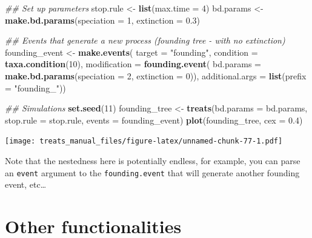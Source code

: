 \documentclass[
]{book}
\newenvironment{Shaded}{\begin{snugshade}}{\end{snugshade}}
\newcommand{\CommentTok}[1]{\textcolor[rgb]{0.56,0.35,0.01}{\textit{#1}}}
\newcommand{\DataTypeTok}[1]{\textcolor[rgb]{0.13,0.29,0.53}{#1}}
\newcommand{\DecValTok}[1]{\textcolor[rgb]{0.00,0.00,0.81}{#1}}
\newcommand{\FloatTok}[1]{\textcolor[rgb]{0.00,0.00,0.81}{#1}}
\newcommand{\KeywordTok}[1]{\textcolor[rgb]{0.13,0.29,0.53}{\textbf{#1}}}
\newcommand{\NormalTok}[1]{#1}
\newcommand{\StringTok}[1]{\textcolor[rgb]{0.31,0.60,0.02}{#1}}
\begin{document}
\begin{Shaded}
\begin{Highlighting}[]
\CommentTok{\#\# Set up parameters}
\NormalTok{stop.rule \textless{}{-}}\StringTok{ }\KeywordTok{list}\NormalTok{(}\DataTypeTok{max.time =} \DecValTok{4}\NormalTok{)}
\NormalTok{bd.params \textless{}{-}}\StringTok{ }\KeywordTok{make.bd.params}\NormalTok{(}\DataTypeTok{speciation =} \DecValTok{1}\NormalTok{, }\DataTypeTok{extinction =} \FloatTok{0.3}\NormalTok{)}

\CommentTok{\#\# Events that generate a new process (founding tree {-} with no extinction)}
\NormalTok{founding\_event \textless{}{-}}\StringTok{ }\KeywordTok{make.events}\NormalTok{(}
                  \DataTypeTok{target       =} \StringTok{"founding"}\NormalTok{,}
                  \DataTypeTok{condition    =} \KeywordTok{taxa.condition}\NormalTok{(}\DecValTok{10}\NormalTok{),}
                  \DataTypeTok{modification =} \KeywordTok{founding.event}\NormalTok{(}
                                    \DataTypeTok{bd.params =} \KeywordTok{make.bd.params}\NormalTok{(}\DataTypeTok{speciation =} \DecValTok{2}\NormalTok{,}
                                                               \DataTypeTok{extinction =} \DecValTok{0}\NormalTok{)),}
                  \DataTypeTok{additional.args =} \KeywordTok{list}\NormalTok{(}\DataTypeTok{prefix =} \StringTok{"founding\_"}\NormalTok{))}
    
\CommentTok{\#\# Simulations}
\KeywordTok{set.seed}\NormalTok{(}\DecValTok{11}\NormalTok{)}
\NormalTok{founding\_tree \textless{}{-}}\StringTok{ }\KeywordTok{treats}\NormalTok{(}\DataTypeTok{bd.params =}\NormalTok{ bd.params,}
                      \DataTypeTok{stop.rule =}\NormalTok{ stop.rule,}
                      \DataTypeTok{events    =}\NormalTok{ founding\_event)}
\KeywordTok{plot}\NormalTok{(founding\_tree, }\DataTypeTok{cex =} \FloatTok{0.4}\NormalTok{)}
\end{Highlighting}
\end{Shaded}

\texttt{[image: treats\_manual\_files/figure-latex/unnamed-chunk-77-1.pdf]}

Note that the nestedness here is potentially endless, for example, you can parse an \texttt{event} argument to the \texttt{founding.event} that will generate another founding event, etc\ldots{}

\hypertarget{others}{%
\chapter{Other functionalities}\label{others}}
\end{document}
